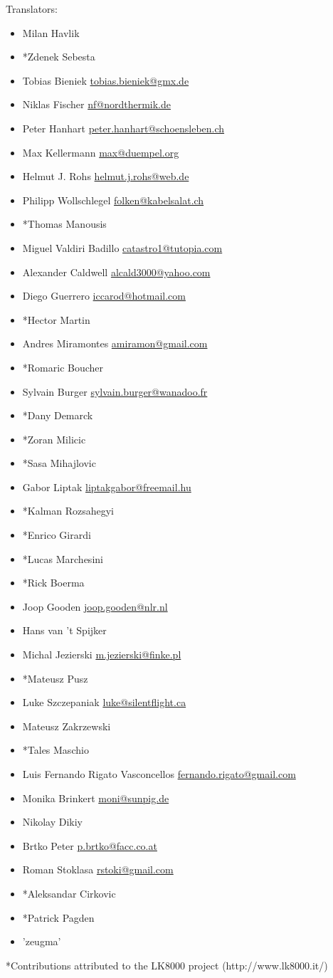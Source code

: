Translators:
\begin{itemize}
\item Milan Havlik
\item*Zdenek Sebesta
\item Tobias Bieniek \url{tobias.bieniek@gmx.de}
\item Niklas Fischer \url{nf@nordthermik.de}
\item Peter Hanhart \url{peter.hanhart@schoensleben.ch}
\item Max Kellermann \url{max@duempel.org}
\item Helmut J. Rohs \url{helmut.j.rohs@web.de}
\item Philipp Wollschlegel \url{folken@kabelsalat.ch}
\item*Thomas Manousis
\item Miguel Valdiri Badillo \url{catastro1@tutopia.com}
\item Alexander Caldwell \url{alcald3000@yahoo.com}
\item Diego Guerrero \url{iccarod@hotmail.com}
\item*Hector Martin
\item Andres Miramontes \url{amiramon@gmail.com}
\item*Romaric Boucher
\item Sylvain Burger \url{sylvain.burger@wanadoo.fr}
\item*Dany Demarck
\item*Zoran Milicic
\item*Sasa Mihajlovic
\item Gabor Liptak \url{liptakgabor@freemail.hu}
\item*Kalman Rozsahegyi
\item*Enrico Girardi
\item*Lucas Marchesini
\item*Rick Boerma
\item Joop Gooden \url{joop.gooden@nlr.nl}
\item Hans van 't Spijker
\item Michal Jezierski \url{m.jezierski@finke.pl}
\item*Mateusz Pusz
\item Luke Szczepaniak \url{luke@silentflight.ca}
\item Mateusz Zakrzewski
\item*Tales Maschio
\item Luis Fernando Rigato Vasconcellos \url{fernando.rigato@gmail.com}
\item Monika Brinkert \url{moni@sunpig.de}
\item Nikolay Dikiy
\item Brtko Peter \url{p.brtko@facc.co.at}
\item Roman Stoklasa \url{rstoki@gmail.com}
\item*Aleksandar Cirkovic
\item*Patrick Pagden
\item 'zeugma'
\end{itemize}
*Contributions attributed to the LK8000 project (http://www.lk8000.it/)

